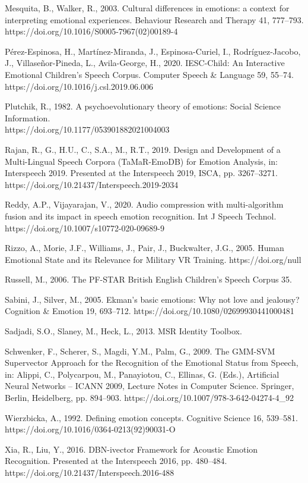 \small
\hangindent=0.5cm
Mesquita, B., Walker, R., 2003. Cultural differences in emotions: a context for interpreting emotional experiences. Behaviour Research and Therapy 41, 777–793. https://doi.org/10.1016/S0005-7967(02)00189-4

\small
\hangindent=0.5cm
Pérez-Espinosa, H., Martínez-Miranda, J., Espinosa-Curiel, I., Rodríguez-Jacobo, J., Villaseñor-Pineda, L., Avila-George, H., 2020. IESC-Child: An Interactive Emotional Children’s Speech Corpus. Computer Speech \& Language 59, 55–74. https://doi.org/10.1016/j.csl.2019.06.006

\small
\hangindent=0.5cm
Plutchik, R., 1982. A psychoevolutionary theory of emotions: Social Science Information. \\https://doi.org/10.1177/053901882021004003

\small
\hangindent=0.5cm
Rajan, R., G., H.U., C., S.A., M., R.T., 2019. Design and Development of a Multi-Lingual Speech Corpora (TaMaR-EmoDB) for Emotion Analysis, in: Interspeech 2019. Presented at the Interspeech 2019, ISCA, pp. 3267–3271. https://doi.org/10.21437/Interspeech.2019-2034

\small
\hangindent=0.5cm
Reddy, A.P., Vijayarajan, V., 2020. Audio compression with multi-algorithm fusion and its impact in speech emotion recognition. Int J Speech Technol. https://doi.org/10.1007/s10772-020-09689-9

\small
\hangindent=0.5cm
Rizzo, A., Morie, J.F., Williams, J., Pair, J., Buckwalter, J.G., 2005. Human Emotional State and its Relevance for Military VR Training. https://doi.org/null

\small
\hangindent=0.5cm
Russell, M., 2006. The PF-STAR British English Children’s Speech Corpus 35.

\small
\hangindent=0.5cm
Sabini, J., Silver, M., 2005. Ekman’s basic emotions: Why not love and jealousy? Cognition \& Emotion 19, 693–712. https://doi.org/10.1080/02699930441000481

\small
\hangindent=0.5cm
Sadjadi, S.O., Slaney, M., Heck, L., 2013. MSR Identity Toolbox.

\small
\hangindent=0.5cm
Schwenker, F., Scherer, S., Magdi, Y.M., Palm, G., 2009. The GMM-SVM Supervector Approach for the Recognition of the Emotional Status from Speech, in: Alippi, C., Polycarpou, M., Panayiotou, C., Ellinas, G. (Eds.), Artificial Neural Networks – ICANN 2009, Lecture Notes in Computer Science. Springer, Berlin, Heidelberg, pp. 894–903. https://doi.org/10.1007/978-3-642-04274-4\_92

\small
\hangindent=0.5cm
Wierzbicka, A., 1992. Defining emotion concepts. Cognitive Science 16, 539–581. \\https://doi.org/10.1016/0364-0213(92)90031-O

\small
\hangindent=0.5cm
Xia, R., Liu, Y., 2016. DBN-ivector Framework for Acoustic Emotion Recognition. Presented at the Interspeech 2016, pp. 480–484. https://doi.org/10.21437/Interspeech.2016-488

